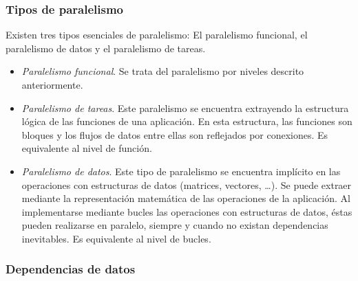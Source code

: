 \documentclass[11pt,twoside,a4paper]{article}
\begin{document}
\subsubsection*{Tipos de paralelismo}

Existen tres tipos esenciales de paralelismo: El paralelismo funcional, el paralelismo de datos y el
paralelismo de tareas.
\begin{itemize}[noitemsep]
	\item \textit{Paralelismo funcional}. Se trata del paralelismo por niveles descrito anteriormente.
	\item \textit{Paralelismo de tareas}. Este paralelismo se encuentra extrayendo la estructura lógica de
	las funciones de una aplicación. En esta estructura, las funciones son bloques y los flujos de datos
	entre ellas son reflejados por conexiones. Es equivalente al nivel de función.
	\item \textit{Paralelismo de datos}. Este tipo de paralelismo se encuentra implícito en las operaciones
	con estructuras de datos (matrices, vectores, \dots). Se puede extraer mediante la representación
	matemática de las operaciones de la aplicación. Al implementarse mediante bucles las operaciones con
	estructuras de datos, éstas pueden realizarse en paralelo, siempre y cuando no existan dependencias
	inevitables. Es equivalente al nivel de bucles.
\end{itemize}

\subsubsection*{Dependencias de datos}
\end{document}
